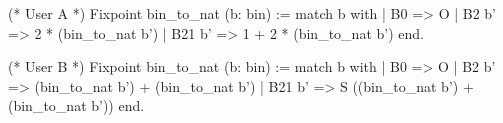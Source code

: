 (* User A *)
Fixpoint bin_to_nat (b: bin) :=
  match b with
  | B0 => O
  | B2 b' =>
      2 * (bin_to_nat b')
  | B21 b' =>
      1 + 2 * (bin_to_nat b')
  end.

(* User B *)
Fixpoint bin_to_nat (b: bin) :=
  match b with
  | B0 => O
  | B2 b' =>
      (bin_to_nat b') +
      (bin_to_nat b')
  | B21 b' =>
      S ((bin_to_nat b') +
         (bin_to_nat b'))
  end.
